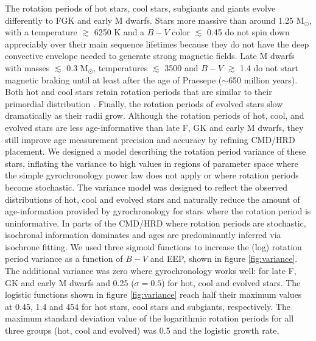 The rotation periods of hot stars, cool stars, subgiants and giants evolve
differently to FGK and early M dwarfs.
Stars more massive than around 1.25 M$_\odot$, with a temperature $\gtrsim$
6250 K and a $B-V$ color $\lesssim$ 0.45 do not spin down appreciably over
their main sequence lifetimes because they do not have the deep convective
envelope needed to generate strong magnetic fields.
Late M dwarfs with masses $\lesssim$ 0.3 M$_\odot$, temperatures $\lesssim$
3500 and $B-V$ $\gtrsim$ 1.4 do not start magnetic braking until at least
after the age of Praesepe ($\sim$650 million years).
Both hot and cool stars retain rotation periods that are similar to their
primordial distribution \citep[see \eg][]{matt2012}.
Finally, the rotation periods of evolved stars slow dramatically as their
radii grow.
Although the rotation periods of hot, cool, and evolved stars are less
age-informative than late F, GK and early M dwarfs, they still improve age
measurement precision and accuracy by refining CMD/HRD placement.
We designed a model describing the rotation period variance of these stars,
inflating the variance to high values in regions of parameter space where the
simple gyrochronology power law does not apply or where rotation periods
become stochastic.
The variance model was designed to reflect the observed distributions of hot,
cool and evolved stars and naturally reduce the amount of age-information
provided by gyrochronology for stars where the rotation period is
uninformative.
In parts of the CMD/HRD where rotation periods are stochastic, isochronal
information dominates and ages are predominantly inferred via isochrone
fitting.
We used three sigmoid functions to increase the (log) rotation period variance
as a function of $B-V$ and EEP, shown in figure \ref{fig:variance}.
The additional variance was zero where gyrochronology works well: for late F,
GK and early M dwarfs and 0.25 ($\sigma = 0.5$) for hot, cool and evolved
stars.
The logistic functions shown in figure \ref{fig:variance} reach half their
maximum values at 0.45, 1.4 and 454 for hot stars, cool stars and subgiants,
respectively.
The maximum standard deviation value of the logarithmic rotation periods for
all three groups (hot, cool and evolved) was 0.5 and the logistic growth rate,
